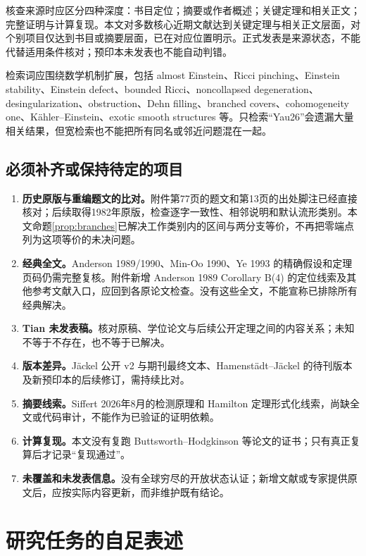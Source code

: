 \documentclass[11pt,a4paper]{article}
\theoremstyle{definition}
\begin{document}
核查来源时应区分四种深度：书目定位；摘要或作者概述；关键定理和相关正文；完整证明与计算复现。本文对多数核心近期文献达到关键定理与相关正文层面，对个别项目仅达到书目或摘要层面，已在对应位置明示。正式发表是来源状态，不能代替适用条件核对；预印本未发表也不能自动判错。

检索词应围绕数学机制扩展，包括 almost Einstein、Ricci pinching、Einstein stability、Einstein defect、bounded Ricci、noncollapsed degeneration、desingularization、obstruction、Dehn filling、branched covers、cohomogeneity one、Kähler--Einstein、exotic smooth structures 等。只检索“Yau26”会遗漏大量相关结果，但宽检索也不能把所有同名或邻近问题混在一起。

\subsection{必须补齐或保持待定的项目}

\begin{enumerate}
\item \textbf{历史原版与重编题文的比对。}附件第77页的题文和第13页的出处脚注已经直接核对；后续取得1982年原版，检查逐字一致性、相邻说明和默认流形类别。本文命题\ref{prop:branches}已解决工作类别内的区间与两分支等价，不再把零端点列为这项等价的未决问题。
\item \textbf{经典全文。}Anderson 1989/1990、Min-Oo 1990、Ye 1993 的精确假设和定理页码仍需完整复核。附件新增 Anderson 1989 Corollary B(4) 的定位线索及其他参考文献入口，应回到各原论文检查。没有这些全文，不能宣称已排除所有经典解决。
\item \textbf{Tian 未发表稿。}核对原稿、学位论文与后续公开定理之间的内容关系；未知不等于不存在，也不等于已解决。
\item \textbf{版本差异。}Jäckel 公开 v2 与期刊最终文本、Hamenstädt--Jäckel 的待刊版本及新预印本的后续修订，需持续比对。
\item \textbf{摘要线索。}Siffert 2026年8月的检测原理和 Hamilton 定理形式化线索，尚缺全文或代码审计，不能作为已验证的证明依赖。
\item \textbf{计算复现。}本文没有复跑 Buttsworth--Hodgkinson 等论文的证书；只有真正复算后才记录“复现通过”。
\item \textbf{未覆盖和未发表信息。}没有全球穷尽的开放状态认证；新增文献或专家提供原文后，应按实际内容更新，而非维护既有结论。
\end{enumerate}

\section{研究任务的自足表述}
\end{document}
